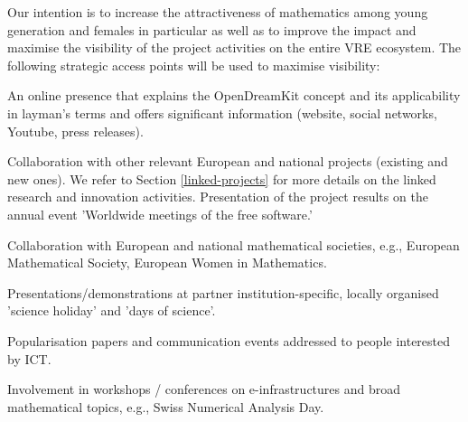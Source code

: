 Our intention is to increase the attractiveness of mathematics among young generation and females in particular as well as to improve the impact and maximise the visibility of the project activities on the entire VRE ecosystem. The following strategic access points will be used to maximise visibility:

\begin{compactenum}
\item An online presence that explains the OpenDreamKit concept and its applicability in layman's terms and offers significant information (website, social networks, Youtube, press releases).
\item Collaboration with other relevant European and national projects (existing and new ones). We refer to Section \ref{linked-projects} for more details on the linked research and innovation activities.  Presentation of the project results on the annual event 'Worldwide meetings of the free software.' 
\item Collaboration with European and national mathematical societies, e.g., European Mathematical Society, European Women in Mathematics.
\item Presentations/demonstrations at partner institution-specific, locally organised 'science holiday' and 'days of science'.
\item Popularisation papers and communication events addressed to people interested by ICT. 
\item Involvement in workshops / conferences on e-infrastructures and broad mathematical topics, e.g., Swiss Numerical Analysis Day.
\end{compactenum}

